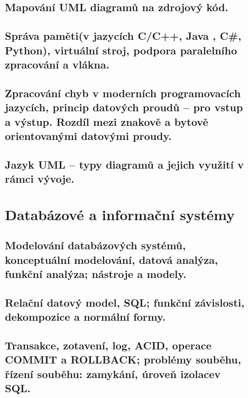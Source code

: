 \documentclass[twoside]{book}
\begin{document}
\chapter{Mapování UML diagramů na zdrojový kód.}

\clearpage

\chapter{Správa paměti(v jazycích C/C++, Java , C\#, Python), virtuální stroj, podpora paralelního zpracování a vlákna.}

\clearpage

\chapter{Zpracování chyb v moderních programovacích jazycích, princip datových proudů – pro vstup a výstup. Rozdíl mezi znakově a bytově orientovanými datovými proudy.}

\clearpage

\chapter{Jazyk UML – typy diagramů a jejich využití v rámci vývoje.}

\clearpage

\part{Databázové a informační systémy}

\chapter{Modelování databázových systémů, konceptuální modelování, datová analýza, funkční analýza; nástroje a modely. }

\clearpage

\chapter{Relační datový model, SQL; funkční závislosti, dekompozice a normální formy.}

\clearpage

\chapter{Transakce, zotavení, log, ACID, operace COMMIT a ROLLBACK; problémy souběhu, řízení souběhu: zamykání, úroveň izolacev SQL.}

\clearpage
\end{document}
